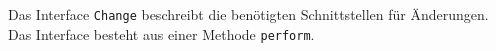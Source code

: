 Das Interface \verb#Change# beschreibt die benötigten Schnittstellen für Änderungen.
Das Interface besteht aus einer Methode \verb#perform#.